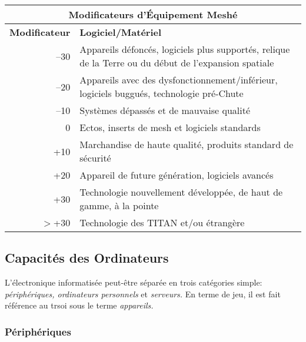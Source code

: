 \begin{table} \begin{tabular}{|r|l|} \hline

\multicolumn{2}{|c|}{\textbf{Modificateurs d'Équipement Meshé}} \\ \hline

\textbf{Modificateur} &\textbf{Logiciel/Matériel} \\ \hline

–30 &Appareils défoncés, logiciels plus supportés, relique de la Terre ou du début de l'expansion spatiale \\ \hline

–20 &Appareils avec des dysfonctionnement/inférieur, logiciels buggués, technologie pré-Chute \\ \hline

–10 &Systèmes dépassés et de mauvaise qualité \\ \hline

0 &Ectos, inserts de mesh et logiciels standards\\ \hline

+10 &Marchandise de haute qualité, produits standard de sécurité \\ \hline

+20 &Appareil de future génération, logiciels avancés \\ \hline

+30 &Technologie nouvellement développée, de haut de gamme, à la pointe \\ \hline

$>$+30 &Technologie des TITAN et/ou étrangère\\ \hline

\end{tabular} \label{tab:mesh-gear-modifiers} \end{table} 

\subsection{Capacités des Ordinateurs} 

L'électronique informatisée peut-être séparée en trois catégories simple: \textit{périphériques, ordinateurs personnels}\textit{} et \textit{serveurs.} En terme de jeu, il est fait référence au trsoi sous le terme \textit{appareils.} 

\subsubsection{Périphériques} 

